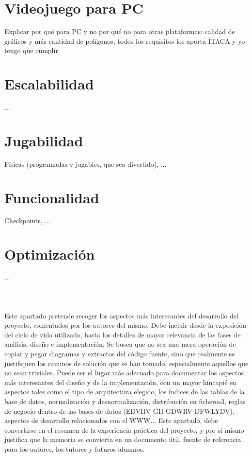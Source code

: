 

\section{Videojuego para PC}

Explicar por qué para PC y no por qué no para otras plataformas: calidad de gráficos y más cantidad de polígonos, todos los requisitos los aporta ÍTACA y yo tengo que cumplir

\section{Escalabilidad}

...

\section{Jugabilidad}

Físicas (programadas y jugables, que sea divertido), ...

\section{Funcionalidad}

Checkpoints, ...

\section{Optimización}

...
\\\\
\\\\
Este apartado pretende recoger los aspectos más interesantes del desarrollo del proyecto, comentados por los autores del mismo.
Debe incluir desde la exposición del ciclo de vida utilizado, hasta los detalles de mayor relevancia de las fases de análisis, diseño e implementación.
Se busca que no sea una mera operación de copiar y pegar diagramas y extractos del código fuente, sino que realmente se justifiquen los caminos de solución que se han tomado, especialmente aquellos que no sean triviales.
Puede ser el lugar más adecuado para documentar los aspectos más interesantes del diseño y de la implementación, con un mayor hincapié en aspectos tales como el tipo de arquitectura elegido, los índices de las tablas de la base de datos, normalización y desnormalización, distribución en ficheros3, reglas de negocio dentro de las bases de datos (EDVHV GH GDWRV DFWLYDV), aspectos de desarrollo relacionados con el WWW...
Este apartado, debe convertirse en el resumen de la experiencia práctica del proyecto, y por sí mismo justifica que la memoria se convierta en un documento útil, fuente de referencia para los autores, los tutores y futuros alumnos.
